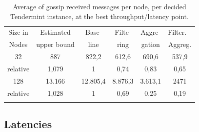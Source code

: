 

\begin{table}[h!]
\center
	\begin{tabular}{c c c c c c }
	\hline
     Size in   & Estimated &   Base-    & Filte-      & Aggre-     & Filter.+  \\ 
	 Nodes & upper bound &     line   &   ring     &   gation    & Aggreg.  \\  \hline
	32  		& 887 & 		822,2        &	612,6	&	690,6	&  537,9 \\
 	relative   	& 1,079    & 		  1		     &	0,74	&	0,83	&  0,65      \\ \hline
	128  		& 13.166 & 		12.805,4   &	8.876,3	&	3.613,1	&  2471  \\ 
 	relative   	&  1,028   & 		  1		     &	0,69	&	0,25	&  0,19      \\ \hline \\
	\end{tabular}
	\caption{Average of gossip received messages per node, per decided Tendermint instance, at the best throughput/latency point.}
  \label{tab:msgsRcvdPerInstance}
 \vspace{-5mm}
\end{table}


\subsection{Latencies}
\label{sec:latency-cdfs}

